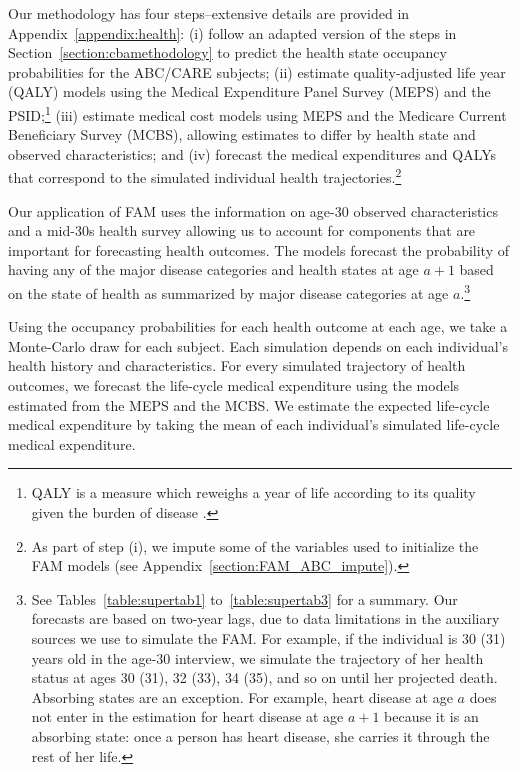 Our methodology has four steps--extensive details are provided in Appendix~\ref{appendix:health}: (i) follow an adapted version of the steps in Section~\ref{section:cbamethodology} to predict the health state occupancy probabilities for the ABC/CARE subjects; (ii) estimate quality-adjusted life year (QALY) models using the Medical Expenditure Panel Survey (MEPS) and the PSID;\footnote{QALY is a measure which reweighs a year of life according to its quality given the burden of disease \citep{Dolan_1997_Modeling_MC,Shaw_etal_2005_EQ5D_MC}.} (iii) estimate medical cost models using MEPS and the Medicare Current Beneficiary Survey (MCBS), allowing estimates to differ by health state and observed characteristics; and (iv) forecast the medical expenditures and QALYs that correspond to the simulated individual health trajectories.\footnote{As part of step (i), we impute some of the variables used to initialize the FAM models (see  Appendix~\ref{section:FAM_ABC_impute}).}

Our application of FAM uses the information on age-30 observed characteristics and a mid-30s health survey allowing us to account for components that are important for forecasting health outcomes. The models forecast the probability of having any of the major disease categories and health states at age $a+1$ based on the state of health as summarized by major disease categories at age $a$.\footnote{See Tables~\ref{table:supertab1} to~\ref{table:supertab3} for a summary. Our forecasts are based on two-year lags, due to data limitations in the auxiliary sources we use to simulate the FAM. For example, if the individual is 30 (31) years old in the age-30 interview, we simulate the trajectory of her health status at ages 30 (31), 32 (33), 34 (35), and so on until her projected death. Absorbing states are an exception. For example, heart disease at age $a$ does not enter in the estimation for heart disease at age $a+1$ because it is an absorbing state: once a person has heart disease, she carries it through the rest of her life.}

Using the occupancy probabilities for each health outcome at each age, we take a Monte-Carlo draw for each subject. Each simulation depends on each individual's health history and characteristics. For every simulated trajectory of health outcomes, we forecast the life-cycle medical expenditure using the models estimated from the MEPS and the MCBS. We estimate the expected life-cycle medical expenditure by taking the mean of each individual's simulated life-cycle medical expenditure.


